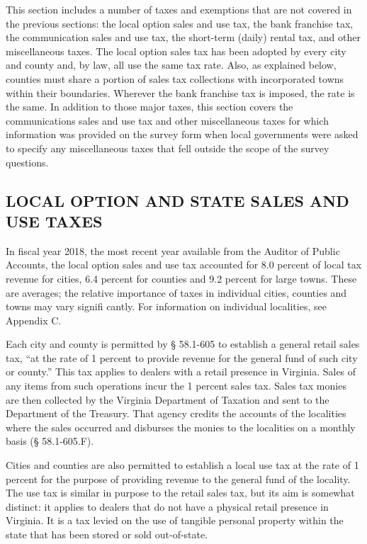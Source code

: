 \documentclass[
]{book}
\begin{document}
This section includes a number of taxes and exemptions that are not covered in the previous sections: the local option sales and use tax, the bank franchise tax, the communication sales and use tax, the short-term (daily) rental tax, and other miscellaneous taxes. The local option sales tax has been adopted by every city and county and, by law, all use the same tax rate. Also, as explained below, counties must share a portion of sales tax collections with incorporated towns within their boundaries. Wherever the bank franchise tax is imposed, the rate is the same. In addition to those major taxes, this section covers the communications sales and use tax and other miscellaneous taxes for which information was provided on the survey form when local governments were asked to specify any miscellaneous taxes that fell outside the scope of the survey questions.

\hypertarget{local-option-and-state-sales-and-use-taxes}{%
\subsection{LOCAL OPTION AND STATE SALES AND USE TAXES}\label{local-option-and-state-sales-and-use-taxes}}

In fiscal year 2018, the most recent year available from the Auditor of Public Accounts, the local option sales and use tax accounted for 8.0 percent of local tax revenue for cities, 6.4 percent for counties and 9.2 percent for large towns. These are averages; the relative importance of taxes in individual cities, counties and towns may vary signifi cantly. For information on individual localities, see Appendix C.

Each city and county is permitted by § 58.1-605 to establish a general retail sales tax, ``at the rate of 1 percent to provide revenue for the general fund of such city or county.'' This tax applies to dealers with a retail presence in Virginia. Sales of any items from such operations incur the 1 percent sales tax. Sales tax monies are then collected by the Virginia Department of Taxation and sent to the Department of the Treasury. That agency credits the accounts of the localities where the sales occurred and disburses the monies to the localities on a monthly basis (§ 58.1-605.F).

Cities and counties are also permitted to establish a local use tax at the rate of 1 percent for the purpose of providing revenue to the general fund of the locality. The use tax is similar in purpose to the retail sales tax, but its aim is somewhat distinct: it applies to dealers that do not have a physical retail presence in Virginia. It is a tax levied on the use of tangible personal property within the state that has been stored or sold out-of-state.
\end{document}
